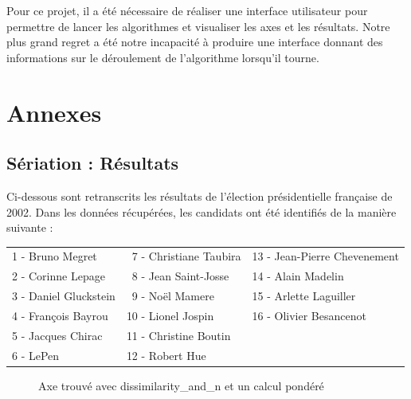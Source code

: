 \documentclass[11pt, a4paper]{article}
\begin{document}
Pour ce projet, il a été nécessaire de réaliser une interface utilisateur pour permettre de lancer les algorithmes et visualiser les axes et les résultats. Notre plus grand regret a été notre incapacité à produire une interface donnant des informations sur le déroulement de l'algorithme lorsqu'il tourne.

\clearpage
\appendix
\section{Annexes}
\subsection{Sériation : Résultats}
\label{resultats-france-seriation}
Ci-dessous sont retranscrits les résultats de l'élection présidentielle française de 2002. Dans les données récupérées, les candidats ont été identifiés de la manière suivante :

\bigskip

\noindent\begin{tabularx}{\textwidth}{XXX}
    1 - Bruno Megret & ~7 - Christiane Taubira & 13 - Jean-Pierre Chevenement\\
    2 - Corinne Lepage & ~8 - Jean Saint-Josse & 14 - Alain Madelin\\
    3 - Daniel Gluckstein & ~9 - Noël Mamere & 15 - Arlette Laguiller\\
    4 - François Bayrou & 10 - Lionel Jospin & 16 - Olivier Besancenot\\
    5 - Jacques Chirac & 11 - Christine Boutin &\\
    6 - LePen & 12 - Robert Hue &\\
\end{tabularx}

\begin{center}
\begin{figure}[H]
\caption{Axe trouvé avec dissimilarity\_and\_n et un calcul pondéré}
\end{figure}
\end{center}
\end{document}
